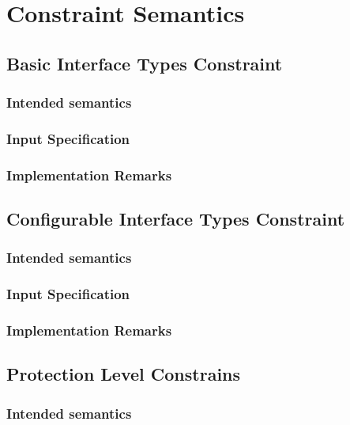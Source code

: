 
\chapter{Constraint Semantics}
\label{cha:constraint-semantics}

\section{Basic Interface Types Constraint}
\label{sec:basic-interf-types}

\subsection{Intended semantics}

\subsection{Input Specification}

\subsection{Implementation Remarks}

\section{Configurable Interface Types Constraint}
\label{sec:conf-interf-types}

\subsection{Intended semantics}

\subsection{Input Specification}

\subsection{Implementation Remarks}

\section{Protection Level Constrains}
\label{sec:prot-level-constr}

\subsection{Intended semantics}

